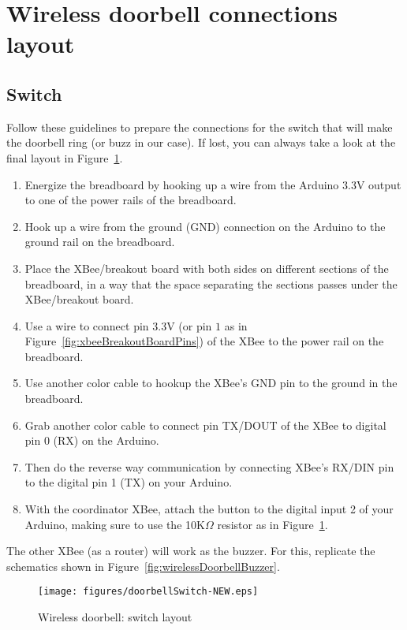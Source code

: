 \section{Wireless doorbell connections layout}

\subsection{Switch}
Follow these guidelines to prepare the connections for the switch that will make the doorbell ring (or buzz in our case). If lost, you can always take a look at the final layout in Figure~\ref{fig:wirelessDoorbellSwitch}.

\begin{enumerate}
  \item Energize the breadboard by hooking up a {\color{red}{red}} wire from the Arduino $3.3$V output to one of the power rails of the breadboard.
  \item Hook up a {\color{blue}{blue}} wire from the ground (GND) connection on the Arduino to the ground rail on the breadboard.
  \item Place the XBee/breakout board with both sides on different sections of the breadboard, in a way that the space separating the sections passes under the XBee/breakout board.
  \item Use a {\color{red}{red}} wire to connect pin $3.3$V (or pin $1$ as in Figure~\ref{fig:xbeeBreakoutBoardPins}) of the XBee to the power rail on the breadboard.
  \item Use another color cable to hookup the XBee's GND pin to the ground in the breadboard.
  \item Grab another color cable to connect pin TX/DOUT of the XBee to digital pin 0 (RX) on the Arduino.
  \item Then do the reverse way communication by connecting XBee's RX/DIN pin to the digital pin 1 (TX) on your Arduino.
  \item With the coordinator XBee, attach the button to the digital input 2 of your Arduino, making sure to use the 10K$\Omega$ resistor as in Figure~\ref{fig:wirelessDoorbellSwitch}.
\end{enumerate}

The other XBee (as a router) will work as the buzzer. For this, replicate the schematics shown in Figure~\ref{fig:wirelessDoorbellBuzzer}.

\begin{figure}[htbp]
  \centering
  \texttt{[image: figures/doorbellSwitch-NEW.eps]}
  \caption{Wireless doorbell: switch layout
  \label{fig:wirelessDoorbellSwitch}}
\end{figure}

